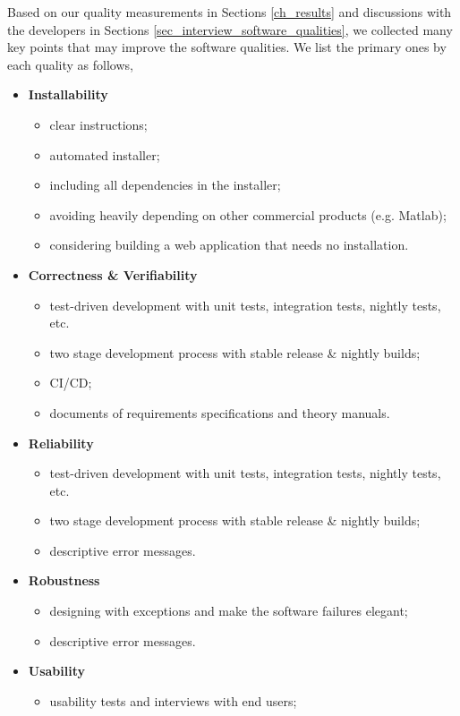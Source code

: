 Based on our quality measurements in Sections \ref{ch_results} and discussions with the developers in Sections \ref{sec_interview_software_qualities}, we collected many key points that may improve the software qualities. We list the primary ones by each quality as follows,
\begin{itemize}
\item \textbf{Installability}
\begin{itemize}
    \item clear instructions;
    \item automated installer;
    \item including all dependencies in the installer;
    \item avoiding heavily depending on other commercial products (e.g. Matlab);
    \item considering building a web application that needs no installation.
\end{itemize}
\item \textbf{Correctness \& Verifiability}
\begin{itemize}
    \item test-driven development with unit tests, integration tests, nightly tests, etc.
    \item two stage development process with stable release \& nightly builds;
    \item CI/CD;
    \item documents of requirements specifications and theory manuals.
\end{itemize}
\item \textbf{Reliability}
\begin{itemize}
    \item test-driven development with unit tests, integration tests, nightly tests, etc.
    \item two stage development process with stable release \& nightly builds;
    \item descriptive error messages.
\end{itemize}
\item \textbf{Robustness}
\begin{itemize}
    \item designing with exceptions and make the software failures elegant;
    \item descriptive error messages.
\end{itemize}
\item \textbf{Usability}
\begin{itemize}
    \item usability tests and interviews with end users;

\end{itemize}
\end{itemize}
